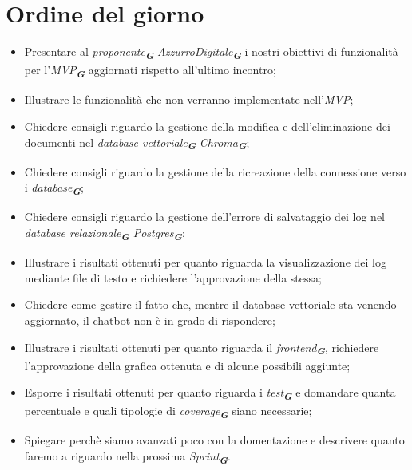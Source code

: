 

\section{Ordine del giorno}

\begin{itemize}
    \item Presentare al \emph{proponente}\textsubscript{\textbf{\textit{G}}} \emph{AzzurroDigitale}\textsubscript{\textbf{\textit{G}}}
    i nostri obiettivi di funzionalità per l'\emph{MVP}\textsubscript{\textbf{\textit{G}}} aggiornati rispetto all'ultimo incontro;
    \item Illustrare le funzionalità che non verranno implementate nell'\emph{MVP};
    \item Chiedere consigli riguardo la gestione della modifica e dell'eliminazione dei documenti nel
    \emph{database vettoriale}\textsubscript{\textbf{\textit{G}}} \emph{Chroma}\textsubscript{\textbf{\textit{G}}};
    \item Chiedere consigli riguardo la gestione della ricreazione della connessione verso i \emph{database}\textsubscript{\textbf{\textit{G}}};
    \item Chiedere consigli riguardo la gestione dell'errore di salvataggio dei log nel \emph{database relazionale}\textsubscript{\textbf{\textit{G}}} \emph{Postgres}\textsubscript{\textbf{\textit{G}}};
    \item Illustrare i risultati ottenuti per quanto riguarda la visualizzazione dei log mediante file di testo e richiedere l'approvazione della stessa;
    \item Chiedere come gestire il fatto che, mentre il database vettoriale sta venendo aggiornato, il chatbot non è in grado di rispondere;
    \item Illustrare i risultati ottenuti per quanto riguarda il \emph{frontend}\textsubscript{\textbf{\textit{G}}}, richiedere l'approvazione della grafica ottenuta e di alcune possibili aggiunte;
    \item Esporre i risultati ottenuti per quanto riguarda i \emph{test}\textsubscript{\textbf{\textit{G}}} e domandare quanta percentuale e quali tipologie di \emph{coverage}\textsubscript{\textbf{\textit{G}}} siano necessarie;
    \item Spiegare perchè siamo avanzati poco con la domentazione e descrivere quanto faremo a riguardo nella prossima \emph{Sprint}\textsubscript{\textbf{\textit{G}}}.
\end{itemize}
